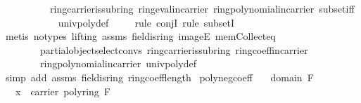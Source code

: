 \begin{isabellebody}
\ \ \ \ \ \ \ \ \ \ ring{\isachardot}{\kern0pt}carrier{\isacharunderscore}{\kern0pt}is{\isacharunderscore}{\kern0pt}subring\ ring{\isachardot}{\kern0pt}eval{\isacharunderscore}{\kern0pt}in{\isacharunderscore}{\kern0pt}carrier\ ring{\isachardot}{\kern0pt}polynomial{\isacharunderscore}{\kern0pt}in{\isacharunderscore}{\kern0pt}carrier\ subset{\isacharunderscore}{\kern0pt}iff\ \isanewline
\ \ \ \ \ \ \ \ \ \ univ{\isacharunderscore}{\kern0pt}poly{\isacharunderscore}{\kern0pt}def{\isacharparenright}{\kern0pt}\ \isanewline
\ \ \isamarkupfalse%
\ {\isacharparenleft}{\kern0pt}rule\ conjI{\isacharcomma}{\kern0pt}\ rule\ subsetI{\isacharparenright}{\kern0pt}\ \isanewline
\ \ \ \isamarkupfalse%
\ {\isacharparenleft}{\kern0pt}metis\ {\isacharparenleft}{\kern0pt}no{\isacharunderscore}{\kern0pt}types{\isacharcomma}{\kern0pt}\ lifting{\isacharparenright}{\kern0pt}\ assms{\isacharparenleft}{\kern0pt}{}{\isacharparenright}{\kern0pt}\ field{\isachardot}{\kern0pt}is{\isacharunderscore}{\kern0pt}ring\ imageE\ mem{\isacharunderscore}{\kern0pt}Collect{\isacharunderscore}{\kern0pt}eq\ \isanewline
\ \ \ \ \ \ \ \ partial{\isacharunderscore}{\kern0pt}object{\isachardot}{\kern0pt}select{\isacharunderscore}{\kern0pt}convs{\isacharparenleft}{\kern0pt}{}{\isacharparenright}{\kern0pt}\ ring{\isachardot}{\kern0pt}carrier{\isacharunderscore}{\kern0pt}is{\isacharunderscore}{\kern0pt}subring\ ring{\isachardot}{\kern0pt}coeff{\isacharunderscore}{\kern0pt}in{\isacharunderscore}{\kern0pt}carrier\isanewline
\ \ \ \ \ \ \ \ ring{\isachardot}{\kern0pt}polynomial{\isacharunderscore}{\kern0pt}in{\isacharunderscore}{\kern0pt}carrier\ univ{\isacharunderscore}{\kern0pt}poly{\isacharunderscore}{\kern0pt}def{\isacharparenright}{\kern0pt}\isanewline
\ \ \isamarkupfalse%
\ {\isacharparenleft}{\kern0pt}simp\ add{\isacharcolon}{\kern0pt}\ assms{\isacharparenleft}{\kern0pt}{}{\isacharparenright}{\kern0pt}\ field{\isachardot}{\kern0pt}is{\isacharunderscore}{\kern0pt}ring\ ring{\isachardot}{\kern0pt}coeff{\isacharunderscore}{\kern0pt}length{\isacharparenright}{\kern0pt}%
\endisatagproof
{\isafoldproof}%
%
\isadelimproof
\isanewline
%
\endisadelimproof
\isanewline
{}\isamarkupfalse%
\ poly{\isacharunderscore}{\kern0pt}neg{\isacharunderscore}{\kern0pt}coeff{\isacharcolon}{\kern0pt}\isanewline
\ \ \ {\isachardoublequoteopen}domain\ F{\isachardoublequoteclose}\isanewline
\ \ \ {\isachardoublequoteopen}x\ {\isasymin}\ carrier\ {\isacharparenleft}{\kern0pt}poly{\isacharunderscore}{\kern0pt}ring\ F{\isacharparenright}{\kern0pt}{\isachardoublequoteclose}\isanewline

\end{isabellebody}
